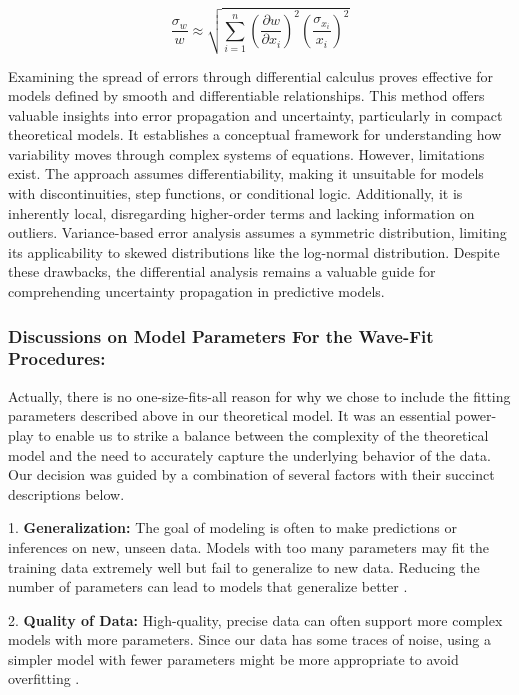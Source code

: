 \documentclass{article}
\begin{document}
\begin{equation}
\frac{\sigma_w}{w} \approx \sqrt{\sum_{i=1}^{n} \left(\frac{\partial w}{\partial x_i}\right)^2 \left(\frac{\sigma_{x_i}}{x_i}\right)^2}
\end{equation}

Examining the spread of errors through differential calculus proves effective for models defined by smooth and differentiable relationships. This method offers valuable insights into error propagation and uncertainty, particularly in compact theoretical models. It establishes a conceptual framework for understanding how variability moves through complex systems of equations\cite{articleb}. However, limitations exist. The approach assumes differentiability, making it unsuitable for models with discontinuities, step functions, or conditional logic. Additionally, it is inherently local, disregarding higher-order terms and lacking information on outliers\cite{articleb}. Variance-based error analysis assumes a symmetric distribution, limiting its applicability to skewed distributions like the log-normal distribution\cite{MCKAY199944}. Despite these drawbacks, the differential analysis remains a valuable guide for comprehending uncertainty propagation in predictive models\cite{articleb}\cite{taylor2022introduction}\cite{LUO201723}.

\subsubsection{Discussions on Model Parameters For the Wave-Fit Procedures:}

Actually, there is no one-size-fits-all reason for why we chose to include the fitting parameters described above in our theoretical model. It was an essential power-play to enable us to strike a balance between the complexity of the theoretical model and the need to accurately capture the underlying behavior of the data. Our decision was guided by a combination of several factors with their succinct descriptions below.

1. \textbf{Generalization:} The goal of modeling is often to make predictions or inferences on new, unseen data. Models with too many parameters may fit the training data extremely well but fail to generalize to new data. Reducing the number of parameters can lead to models that generalize better \cite{james2013introduction}.

2. \textbf{Quality of Data:} High-quality, precise data can often support more complex models with more parameters. Since our data has some traces of noise, using a simpler model with fewer parameters might be more appropriate to avoid overfitting \cite{bishop2006pattern}.
\end{document}

